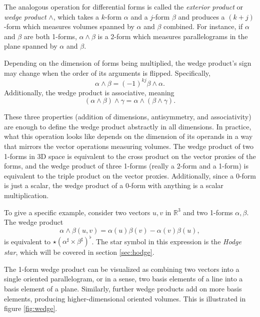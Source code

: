 \documentclass[utf8,english]{gradu3}
\begin{document}
The analogous operation for differential forms is called the
\textit{exterior product} or \textit{wedge product} $\wedge$,
which takes a $k$-form $\alpha$ and a $j$-form $\beta$
and produces a $(k+j)$-form which measures volumes spanned by
$\alpha$ and $\beta$ combined.
For instance, if $\alpha$ and $\beta$ are both 1-forms,
$\alpha \wedge \beta$ is a 2-form which measures parallelograms
in the plane spanned by $\alpha$ and $\beta$.

Depending on the dimension of forms being multiplied,
the wedge product's sign may change
when the order of its arguments is flipped. Specifically,
\[
  \alpha \wedge \beta = (-1)^{kj} \beta \wedge \alpha.
\]
Additionally, the wedge product is associative, meaning
\[
  (\alpha \wedge \beta) \wedge \gamma = \alpha \wedge (\beta \wedge \gamma).
\]

These three properties (addition of dimensions, antisymmetry, and associativity)
are enough to define the wedge product abstractly in all dimensions.
In practice, what this operation looks like depends on the dimension of its operands
in a way that mirrors the vector operations measuring volumes.
The wedge product of two 1-forms in 3D space
is equivalent to the cross product on the vector proxies of the forms,
and the wedge product of three 1-forms (really a 2-form and a 1-form)
is equivalent to the triple product on the vector proxies.
Additionally, since a 0-form is just a scalar,
the wedge product of a 0-form with anything is a scalar multiplication.

To give a specific example, consider two vectors $u,v$ in $\mathbb{R}^3$
and two 1-forms $\alpha, \beta$. The wedge product
\[
  \alpha \wedge \beta (u,v) = \alpha(u)\beta(v) - \alpha(v)\beta(u),
\]
is equivalent to $\star(\alpha^{\sharp} \times \beta^{\sharp})^{\flat}$.
The star symbol in this expression is the \textit{Hodge star},
which will be covered in section \ref{sec:hodge}.

The 1-form wedge product can be visualized as combining two vectors
into a single oriented parallelogram,
or in a sense, two basis elements of a line
into a basis element of a plane.
Similarly, further wedge products add on more basis elements,
producing higher-dimensional oriented volumes.
This is illustrated in figure \ref{fig:wedge}.
\end{document}
